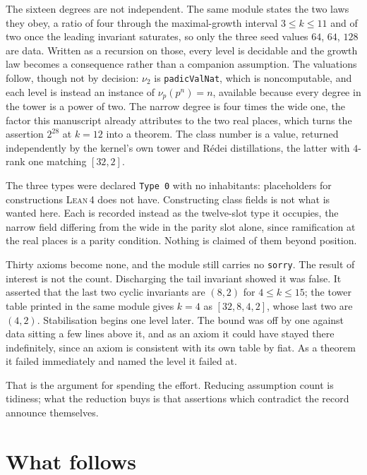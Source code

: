 \documentclass[12pt,a4paper]{article}
\newcommand{\Lean}{\textsc{Lean\,4}}
\begin{document}
The sixteen degrees are not independent. The same module states the two laws
they obey, a ratio of four through the maximal-growth interval $3\le k\le11$ and
of two once the leading invariant saturates, so only the three seed values $64$,
$64$, $128$ are data. Written as a recursion on those, every level is decidable
and the growth law becomes a consequence rather than a companion assumption. The
valuations follow, though not by decision: $\nu_2$ is \texttt{padicValNat}, which
is noncomputable, and each level is instead an instance of $\nu_p(p^n)=n$,
available because every degree in the tower is a power of two. The narrow degree
is four times the wide one, the factor this manuscript already attributes to the
two real places, which turns the assertion $2^{28}$ at $k=12$ into a theorem. The
class number is a value, returned independently by the kernel's own tower and
Rédei distillations, the latter with $4$-rank one matching $[32,2]$.

The three types were declared \texttt{Type 0} with no inhabitants: placeholders
for constructions \Lean{} does not have. Constructing class fields is not what is
wanted here. Each is recorded instead as the twelve-slot type it occupies, the
narrow field differing from the wide in the parity slot alone, since ramification
at the real places is a parity condition. Nothing is claimed of them beyond
position.

Thirty axioms become none, and the module still carries no \texttt{sorry}. The
result of interest is not the count. Discharging the tail invariant showed it was
false. It asserted that the last two cyclic invariants are $(8,2)$ for
$4\le k\le 15$; the tower table printed in the same module gives $k=4$ as
$[32,8,4,2]$, whose last two are $(4,2)$. Stabilisation begins one level later.
The bound was off by one against data sitting a few lines above it, and as an
axiom it could have stayed there indefinitely, since an axiom is consistent with
its own table by fiat. As a theorem it failed immediately and named the level it
failed at.

That is the argument for spending the effort. Reducing assumption count is
tidiness; what the reduction buys is that assertions which contradict the record
announce themselves.

\section{What follows}
\label{sec:follows}
\end{document}
